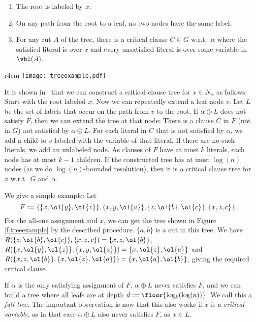 \begin{enumerate}
\item The root is labeled by $x$.
\item On any path from the root to a leaf, no two nodes have the same label.
\item For any cut $A$ of the tree, there is a critical clause $C\in G$ w.r.t.\ $\alpha$ where the satisfied literal is over $x$ and every unsatisfied literal is over some variable in $\vbl(A)$.
\end{enumerate}

\begin{wrapfigure}{r}{4cm}
\texttt{[image: treeexample.pdf]}
\caption{Example Critical Clause Tree}
\label{f.treeexample}
\end{wrapfigure}

It is shown in~\cite{ppsz} that we can construct a critical clause tree for $x\in N_\alpha$ as follows: Start with the root labeled $x$. Now we can repeatedly extend a leaf node $v$. Let $L$ be the set of labels that occur on the path from $v$ to the root. If $\alpha\oplus L$ does not satisfy $F$, then we can extend the tree at that node: There is a clause $C$ in $F$ (not in $G$) not satisfied by $\alpha\oplus L$. For each literal in $C$ that is not satisfied by $\alpha$, we add a child to $v$ labeled with the variable of that literal. If there are no such literals, we add an unlabeled node. As clauses of $F$ have at most $k$ literals, each node has at most $k-1$ children. If the constructed tree has at most $\log(n)$ nodes (as we do $\log(n)$-bounded resolution), then it is a critical clause tree for $x$ w.r.t.\ $G$ and $\alpha$.

We give a simple example: Let \[F:=\{\{x,\ol{y},\ol{z}\},\{x,y,\ol{a}\},\{z,\ol{b},\ol{c}\},\{x,z,c\}\}.\] For the all-one assignment and $x$, we can get the tree shown in Figure \ref{f.treeexample} by the described procedure. $\{a,b\}$ is a cut in this tree. We have $R(\{z,\ol{b},\ol{c}\},\{x,z,c\})=\{x,z,\ol{b}\}$, $R(\{x,\ol{y},\ol{z}\},\{x,y,\ol{a}\})=\{x,\ol{z},\ol{a}\}$ and $R(\{x,z,\ol{b}\},\{x,\ol{z},\ol{a}\})=\{x,\ol{a},\ol{b}\}$, giving the required critical clause.

If $\alpha$ is the only satisfying assignment of $F$, $\alpha\oplus L$
never satisfies $F$, and we can build a tree where all leafs are at
depth $d:=\floor{\log_k(\log(n))}$. We call this a {\em full tree}. The
important observation is now that this also works if $x$ is a
\emph{critical variable}, as in that case $\alpha\oplus L$ also never
satisfies $F$, as $x\in L$.

